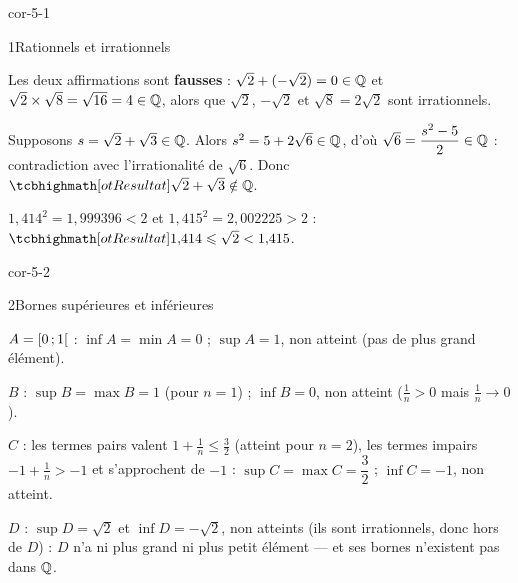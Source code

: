 
\corrigesSouples

\begin{blocLivre}{cor-5-1}
\begin{corrige}{1}{Rationnels et irrationnels}
\begin{questions}
  \item Les deux affirmations sont \textbf{fausses} :
    $\sqrt2+(-\sqrt2)=0\in\mathbb{Q}$ et $\sqrt2\times\sqrt8=\sqrt{16}=4\in\mathbb{Q}$,
    alors que $\sqrt2$, $-\sqrt2$ et $\sqrt8=2\sqrt2$ sont irrationnels.
  \item Supposons $s=\sqrt2+\sqrt3\in\mathbb{Q}$. Alors $s^{2}=5+2\sqrt6\in\mathbb{Q}$,
    d'où $\sqrt6=\dfrac{s^{2}-5}{2}\in\mathbb{Q}$ : contradiction avec
    l'irrationalité de $\sqrt6$. Donc $\res{\sqrt2+\sqrt3\notin\Q}$.
  \item $1{,}414^{2}=1{,}999396<2$ et $1{,}415^{2}=2{,}002225>2$ :
    $\res{1{,}414\leq\sqrt2<1{,}415}$.
\end{questions}
\end{corrige}
\end{blocLivre}

\begin{blocLivre}{cor-5-2}
\begin{corrige}{2}{Bornes supérieures et inférieures}
\begin{questions}
  \item $A=\mathopen{[}0\,{;}\,1\mathclose{[}$ : $\inf A=\min A=0$ ; $\sup A=1$, non atteint
    (pas de plus grand élément).
  \item $B$ : $\sup B=\max B=1$ (pour $n=1$) ; $\inf B=0$, non atteint
    ($\frac1n>0$ mais $\frac1n\to0$).
  \item $C$ : les termes pairs valent $1+\frac1n\leq\frac32$ (atteint pour
    $n=2$), les termes impairs $-1+\frac1n>-1$ et s'approchent de $-1$ :
    $\sup C=\max C=\dfrac32$ ; $\inf C=-1$, non atteint.
  \item $D$ : $\sup D=\sqrt2$ et $\inf D=-\sqrt2$, non atteints (ils sont
    irrationnels, donc hors de $D$) : $D$ n'a ni plus grand ni plus petit
    élément — et ses bornes n'existent pas dans $\mathbb{Q}$.
\end{questions}
\end{corrige}
\end{blocLivre}

